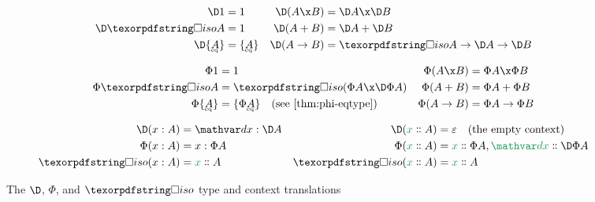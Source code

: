 \begin{figure}\centering


  \begin{align*}
    \D\tunit &= \tunit &
    \D(A \x B) &= \D A \x \D B
    \\
    \D \iso A &= \tunit &
    \D(A + B) &= \D A + \D B
    \\
    \D\tseteq A &= \tseteq A &
    \D(A \to B) &= \iso A \to \D A \to \D B
  \end{align*}\par\begin{align*}
    \Phi\tunit &= \tunit &
    \Phi(A \x B) &= \Phi A \x \Phi B
    \\
    \Phi \iso A &= \iso{(\Phi A \x \DP A)}
    &
    \Phi(A + B) &= \Phi A + \Phi B
    \\
    \Phi\tseteq A &= \tset{\Phi{\eqt A}}
    \quad\text{(see \cref{thm:phi-eqtype})}
    &
    \Phi(A \to B) &= \Phi A \to \Phi B
  \end{align*}
  \vspace{0pt} %


  \begin{align*}
    \D(\h x A) &= \h \dx {\D A} & \D(\hd x A) &= \emptycx\quad\text{(the empty context)}
    \\
    \Phi(\h x A) &= \h x {\Phi A} & \Phi(\hd x A) &= \hd x {\Phi A}, \hd \dx {\DP A}
    \\
    \iso{(\h x A)} &= \hd x A & \iso{(\hd x A)} &= \hd x A
  \end{align*}

  \caption{The $\D$, $\Phi$, and $\iso$ type and context translations}
  \label{fig:PhiDelta}
\end{figure}
